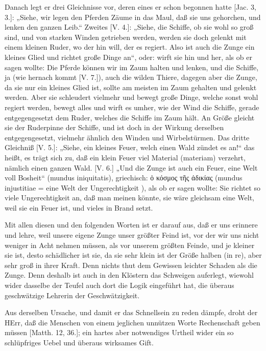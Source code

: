 Danach legt er drei Gleichnisse vor, deren eines er schon begonnen hatte [Jac. 3, 3.]: „Siehe, wir legen den Pferden Zäume in das Maul, daß sie uns gehorchen, und lenken den ganzen Leib.“ Zweites [V. 4.]: „Siehe, die Schiffe, ob sie wohl so groß sind, und von starken Winden getrieben werden, werden sie doch gelenkt mit einem kleinen Ruder, wo der hin will, der es regiert. Also ist auch die Zunge ein kleines Glied und richtet große Dinge an“, oder: wirft sie hin und her, als ob er sagen wollte: Die Pferde können wir im Zaum halten und lenken, und die Schiffe, ja (wie hernach kommt [V. 7.]), auch die wilden Thiere, dagegen aber die Zunge, da sie nur ein kleines Glied ist, sollte am meisten im Zaum gehalten und gelenkt werden. Aber sie schleudert vielmehr und bewegt große Dinge, welche sonst wohl regiert werden, bewegt alles und wirft es umher, wie der Wind die Schiffe, gerade entgegengesetzt dem Ruder, welches die Schiffe im Zaum hält. An Größe gleicht sie der Ruderpinne der Schiffe, und ist doch in der Wirkung derselben entgegengesetzt, vielmehr ähnlich den Winden und Wirbelstürmen. Das dritte Gleichniß [V. 5.]: „Siehe, ein kleines Feuer, welch einen Wald zündet es an!“ das heißt, es trägt sich zu, daß ein klein Feuer viel Material (materiam) verzehrt, nämlich einen ganzen Wald. [V. 6.] „Und die Zunge ist auch ein Feuer, eine Welt voll Bosheit“ (mundus iniquitatis), griechisch: ὁ κόσμος τῆς ἀδικίας (mundus injustitiae = eine Welt der Ungerechtigkeit
), als ob er sagen wollte: Sie richtet so viele Ungerechtigkeit an, daß man meinen könnte, sie wäre gleichsam eine Welt, weil sie ein Feuer ist, und vieles in Brand setzt.

Mit allen diesen und den folgenden Worten ist er darauf aus, daß er uns erinnere und lehre, weil unsere eigene Zunge unser größter Feind ist, vor der wir uns nicht weniger in Acht nehmen müssen, als vor unserem größten Feinde, und je kleiner sie ist, desto schädlicher ist sie, da sie sehr klein ist der Größe halben (in re), aber sehr groß in ihrer Kraft. Denn nichts thut dem Gewissen leichter Schaden als die Zunge. Denn deshalb ist auch in den Klöstern das Schweigen auferlegt, wiewohl wider dasselbe der Teufel auch dort die Logik eingeführt hat, die überaus geschwätzige Lehrerin der Geschwätzigkeit.

Aus derselben Ursache, und damit er das Schnellsein zu reden dämpfe, droht der HErr, daß die Menschen von einem jeglichen unnützen Worte Rechenschaft geben müssen [Matth. 12, 36.]; ein hartes aber notwendiges Urtheil wider ein so schlüpfriges Uebel und überaus wirksames Gift.

